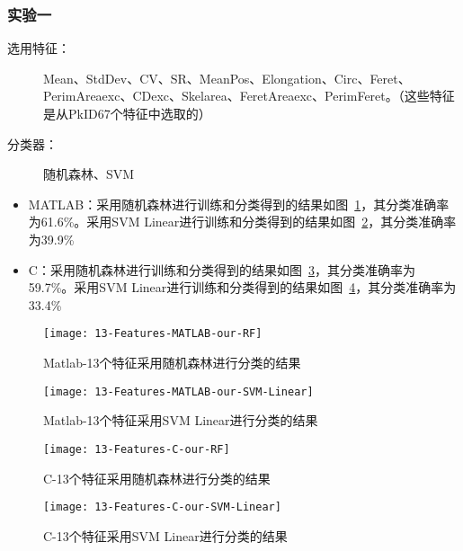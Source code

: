 \subsubsection{实验一}
\begin{description}
\item[选用特征：] Mean、StdDev、CV、SR、MeanPos、Elongation、Circ、Feret、PerimAreaexc、CDexc、Skelarea、FeretAreaexc、PerimFeret。（这些特征是从PkID67个特征中选取的）
\item[分类器：] 随机森林、SVM
\end{description}
\begin{itemize}
\item MATLAB：采用随机森林进行训练和分类得到的结果如图~\ref{fig:13-Features-MATLAB-our-RF}，其分类准确率为61.6\%。采用SVM Linear进行训练和分类得到的结果如图~\ref{fig:13-Features-MATLAB-our-SVM-Linear}，其分类准确率为39.9\%
\item C：采用随机森林进行训练和分类得到的结果如图~\ref{fig:13-Features-C-our-RF}，其分类准确率为59.7\%。采用SVM Linear进行训练和分类得到的结果如图~\ref{fig:13-Features-C-our-SVM-Linear}，其分类准确率为33.4\%
\end{itemize}

\begin{figure}[!ht]
\centering
\texttt{[image: 13-Features-MATLAB-our-RF]}
\caption{Matlab-13个特征采用随机森林进行分类的结果}
\label{fig:13-Features-MATLAB-our-RF}
\end{figure}

\begin{figure}[!ht]
\centering
\texttt{[image: 13-Features-MATLAB-our-SVM-Linear]}
\caption{Matlab-13个特征采用SVM Linear进行分类的结果}
\label{fig:13-Features-MATLAB-our-SVM-Linear}
\end{figure}

\begin{figure}[!ht]
\centering
\texttt{[image: 13-Features-C-our-RF]}
\caption{C-13个特征采用随机森林进行分类的结果}
\label{fig:13-Features-C-our-RF}
\end{figure}

\begin{figure}[!ht]
\centering
\texttt{[image: 13-Features-C-our-SVM-Linear]}
\caption{C-13个特征采用SVM Linear进行分类的结果}
\label{fig:13-Features-C-our-SVM-Linear}
\end{figure}

